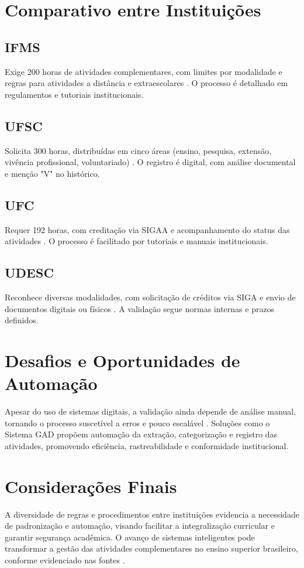 \section{Comparativo entre Instituições}
\subsection{IFMS}
Exige 200 horas de atividades complementares, com limites por modalidade e regras para atividades a distância e extraescolares \cite{setic-ufsc_sistemas_nodate}. O processo é detalhado em regulamentos e tutoriais institucionais.

\subsection{UFSC}
Solicita 300 horas, distribuídas em cinco áreas (ensino, pesquisa, extensão, vivência profissional, voluntariado) \cite{setic-ufsc_sistemas_nodate}. O registro é digital, com análise documental e menção "V" no histórico.

\subsection{UFC}
Requer 192 horas, com creditação via SIGAA e acompanhamento do status das atividades \cite{bayde_ribeiro_sistemas_nodate}. O processo é facilitado por tutoriais e manuais institucionais.

\subsection{UDESC}
Reconhece diversas modalidades, com solicitação de créditos via SIGA e envio de documentos digitais ou físicos \cite{udesc_atividades_nodate}. A validação segue normas internas e prazos definidos.

\section{Desafios e Oportunidades de Automação}
Apesar do uso de sistemas digitais, a validação ainda depende de análise manual, tornando o processo suscetível a erros e pouco escalável \cite{bayde_ribeiro_sistemas_nodate, udesc_atividades_nodate}. Soluções como o Sistema GAD propõem automação da extração, categorização e registro das atividades, promovendo eficiência, rastreabilidade e conformidade institucional.

\section{Considerações Finais}
 A diversidade de regras e procedimentos entre instituições evidencia a necessidade de padronização e automação, visando facilitar a integralização curricular e garantir segurança acadêmica. O avanço de sistemas inteligentes pode transformar a gestão das atividades complementares no ensino superior brasileiro, conforme evidenciado nas fontes \cite{setic-ufsc_sistemas_nodate, bayde_ribeiro_sistemas_nodate, udesc_atividades_nodate}.

